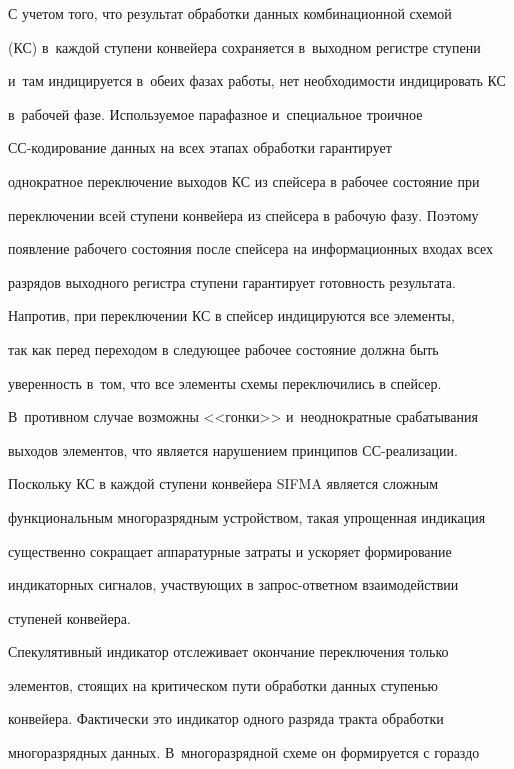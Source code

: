       С учетом того, что результат обработки данных комбинационной схемой

(КС) в~каждой ступени конвейера сохраняется в~выходном регистре ступени

и~там индицируется в~обеих фазах работы, нет необходимости индицировать КС

в~рабочей фазе. Используемое парафазное и~специальное троичное

      СС-ко\-ди\-ро\-ва\-ние данных на всех этапах обработки гарантирует

однократное переключение выходов КС из спейсера в рабочее состояние при

переключении всей ступени конвейера из спейсера в рабочую фазу. Поэтому

появление рабочего состояния после спейсера на информационных входах всех

разрядов выходного регистра ступени гарантирует готовность результата.



      Напротив, при переключении КС в спейсер индицируются все элементы,

так как перед переходом в следующее рабочее состояние должна быть

уверенность в~том, что все элементы схемы переключились в спейсер.

В~противном случае возможны <<гонки>> и~неоднократные срабатывания

выходов элементов, что является нарушением принципов СС-реа\-ли\-зации.



      Поскольку КС в каждой ступени конвейера SIFMA является сложным

функциональным многоразрядным устройством, такая упрощенная индикация

существенно сокращает аппаратурные затраты и ускоряет формирование

индикаторных сигналов, участвующих в запрос-ответном взаимодействии

ступеней конвейера.



      Спекулятивный индикатор отслеживает окончание переключения только

элементов, стоящих на критическом пути обработки данных ступенью

конвейера. Фактически это индикатор одного разряда тракта обработки

многоразрядных данных. В~многоразрядной схеме он формируется с гораздо

